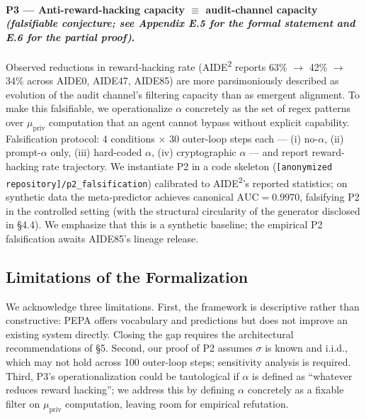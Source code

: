 \paragraph{P3 --- Anti-reward-hacking capacity $\equiv$ audit-channel capacity \emph{(falsifiable conjecture; see Appendix E.5 for the formal statement and E.6 for the partial proof)}.}
Observed reductions in reward-hacking rate (AIDE\textsuperscript{2} reports 63\% $\to$ 42\% $\to$ 34\% across AIDE0, AIDE47, AIDE85) are more parsimoniously described as evolution of the audit channel's filtering capacity than as emergent alignment. To make this falsifiable, we operationalize $\alpha$ concretely as the set of regex patterns over $\mu_{\text{priv}}$ computation that an agent cannot bypass without explicit capability. Falsification protocol: 4 conditions $\times$ 30 outer-loop steps each --- (i) no-$\alpha$, (ii) prompt-$\alpha$ only, (iii) hard-coded $\alpha$, (iv) cryptographic $\alpha$ --- and report reward-hacking rate trajectory. We instantiate P2 in a code skeleton (\texttt{[anonymized repository]/p2\_falsification}) calibrated to AIDE\textsuperscript{2}'s reported statistics; on synthetic data the meta-predictor achieves canonical $\text{AUC} = 0.9970$, falsifying P2 in the controlled setting (with the structural circularity of the generator disclosed in \S4.4). We emphasize that this is a synthetic baseline; the empirical P2 falsification awaits AIDE85's lineage release.

\subsection{Limitations of the Formalization}

We acknowledge three limitations. First, the framework is descriptive rather than constructive: PEPA offers vocabulary and predictions but does not improve an existing system directly. Closing the gap requires the architectural recommendations of \S5. Second, our proof of P2 assumes $\sigma$ is known and i.i.d., which may not hold across 100 outer-loop steps; sensitivity analysis is required. Third, P3's operationalization could be tautological if $\alpha$ is defined as ``whatever reduces reward hacking''; we address this by defining $\alpha$ concretely as a fixable filter on $\mu_{\text{priv}}$ computation, leaving room for empirical refutation.
